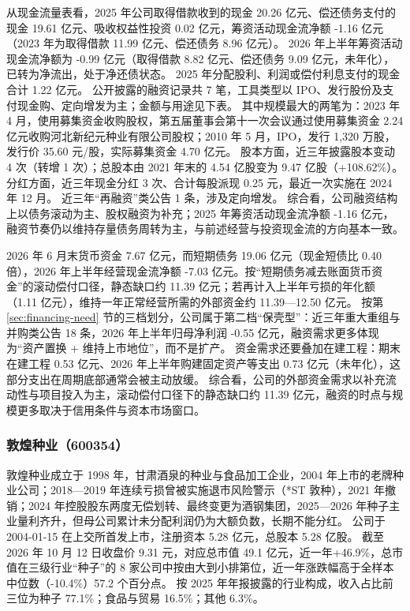  从现金流量表看，2025 年公司取得借款收到的现金 20.26 亿元、偿还债务支付的现金 19.61 亿元、吸收权益性投资 0.02 亿元，筹资活动现金流净额 -1.16 亿元（2023 年为取得借款 11.99 亿元、偿还债务 8.96 亿元）。 2026 年上半年筹资活动现金流净额为 -0.99 亿元（取得借款 8.82 亿元、偿还债务 9.09 亿元，未年化），已转为净流出，处于净还债状态。 2025 年分配股利、利润或偿付利息支付的现金合计 1.22 亿元。 公开披露的融资记录共 7 笔，工具类型以 IPO、发行股份及支付现金购、定向增发为主；金额与用途见下表。 其中规模最大的两笔为：2023 年 4 月，使用募集资金收购股权，第五届董事会第十一次会议通过使用募集资金 2.24 亿元收购河北新纪元种业有限公司股权；2010 年 5 月，IPO，发行 1,320 万股，发行价 35.60 元/股，实际募集资金 4.70 亿元。 股本方面，近三年披露股本变动 4 次（转增 1 次）；总股本由 2021 年末的 4.54 亿股变为 9.47 亿股（+108.62\%）。 分红方面，近三年现金分红 3 次、合计每股派现 0.25 元，最近一次实施在 2024 年 12 月。 近三年“再融资”类公告 1 条，涉及定向增发。 综合看，公司融资结构上以债务滚动为主、股权融资为补充；2025 年筹资活动现金流净额 -1.16 亿元，融资节奏仍以维持存量债务周转为主，与前述经营与投资现金流的方向基本一致。

 2026 年 6 月末货币资金 7.67 亿元，而短期债务 19.06 亿元（现金短债比 0.40 倍），2026 年上半年经营现金流净额 -7.03 亿元。按“短期债务减去账面货币资金”的滚动偿付口径，静态缺口约 11.39 亿元；若再计入上半年亏损的年化额（1.11 亿元），维持一年正常经营所需的外部资金约 11.39---12.50 亿元。 按第 \ref{sec:financing-need} 节的三档划分，公司属于第二档“保壳型”：近三年重大重组与并购类公告 18 条，2026 年上半年归母净利润 -0.55 亿元，融资需求更多体现为“资产置换 + 维持上市地位”，而不是扩产。 资金需求还要叠加在建工程：期末在建工程 0.53 亿元、2026 年上半年购建固定资产等支出 0.73 亿元（未年化），这部分支出在周期底部通常会被主动放缓。 综合看，公司的外部资金需求以补充流动性与项目投入为主，滚动偿付口径下的静态缺口约 11.39 亿元，融资的时点与规模更多取决于信用条件与资本市场窗口。




\subsubsection{敦煌种业（600354）}
\label{co:600354}

 敦煌种业成立于 1998 年，甘肃酒泉的种业与食品加工企业，2004 年上市的老牌种业公司；2018—2019 年连续亏损曾被实施退市风险警示（*ST 敦种），2021 年撤销；2024 年控股股东两度无偿划转、最终变更为酒钢集团，2025—2026 年种子主业量利齐升，但母公司累计未分配利润仍为大额负数，长期不能分红。 公司于 2004-01-15 在上交所首发上市，注册资本 5.28 亿元，总股本 5.28 亿股。 截至 2026 年 10 月 12 日收盘价 9.31 元，对应总市值 49.1 亿元，近一年+46.9\%，总市值在三级行业“种子”的 8 家公司中按由大到小排第位，近一年涨跌幅高于全样本中位数（-10.4\%）57.2 个百分点。 按 2025 年年报披露的行业构成，收入占比前三位为种子 77.1\%；食品与贸易 16.5\%；其他 6.3\%。

